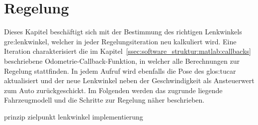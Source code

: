 \chapter{Regelung \dcfirstauthorshort}
\label{cha:regelung}

Dieses Kapitel beschäftigt sich mit der Bestimmung des richtigen Lenkwinkels \gls{gre:lenkwinkel}, welcher in jeder Regelungsiteration neu kalkuliert wird. Eine Iteration charakterisiert die im Kapitel~\ref{ssec:software_struktur:matlab:callbacks} beschriebene Odometrie-Callback-Funktion, in welcher alle Berechnungen zur Regelung stattfinden.
In jedem Aufruf wird ebenfalls die Pose des \gls{glos:tucar} aktualisiert und der neue Lenkwinkel neben der Geschwindigkeit als Ansteuerwert zum Auto zurückgeschickt. 
Im Folgenden werden das zugrunde liegende Fahrzeugmodell und die Schritte zur Regelung näher beschrieben. 

{prinzip}
{zielpunkt}
{lenkwinkel}
{implementierung}

